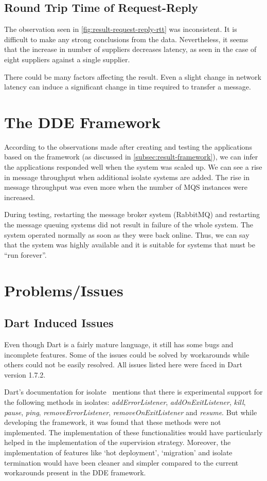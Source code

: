 \subsection{Round Trip Time of Request-Reply}
  The observation seen in \autoref{fig:result-request-reply-rtt} was inconsistent. It is difficult to make any strong conclusions from the data. Nevertheless, it seems that the increase in number of suppliers decreases latency, as seen in the case of eight suppliers against a single supplier.

  There could be many factors affecting the result. Even a slight change in network latency can induce a significant change in time required to transfer a message.

\section{The DDE Framework}
  According to the observations made after creating and testing the applications based on the framework (as discussed in \autoref{subsec:result-framework}), we can infer the applications responded well when the system was scaled up. We can see a rise in message throughput when additional isolate systems are added. The rise in message throughput was even more when the number of MQS instances were increased.

  During testing, restarting the message broker system (RabbitMQ) and restarting the message queuing systems did not result in failure of the whole system. The system operated normally as soon as they were back online. Thus, we can say that the system was highly available and it is suitable for systems that must be “run forever”.

\section{Problems/Issues}

\subsection{Dart Induced Issues}
\label{subsec:result-dartIssues}
  Even though Dart is a fairly mature language, it still has some bugs and incomplete features. Some of the issues could be solved by workarounds while others could not be easily resolved. All issues listed here were faced in Dart version 1.7.2.

  Dart's documentation for isolate~\cite{dartApiIsolate} mentions that there is experimental support for the following methods in isolates: \emph{addErrorListener},  \emph{addOnExitListener}, \emph{kill}, \emph{pause}, \emph{ping}, \emph{removeErrorListener}, \emph{removeOnExitListener} and \emph{resume}. But while developing the framework, it was found that these methods were not implemented. The implementation of these functionalities would have particularly helped in the implementation of the supervision strategy. Moreover, the implementation of features like ‘hot deployment’, ‘migration’ and isolate termination would have been cleaner and simpler compared to the current workarounds present in the DDE framework.

